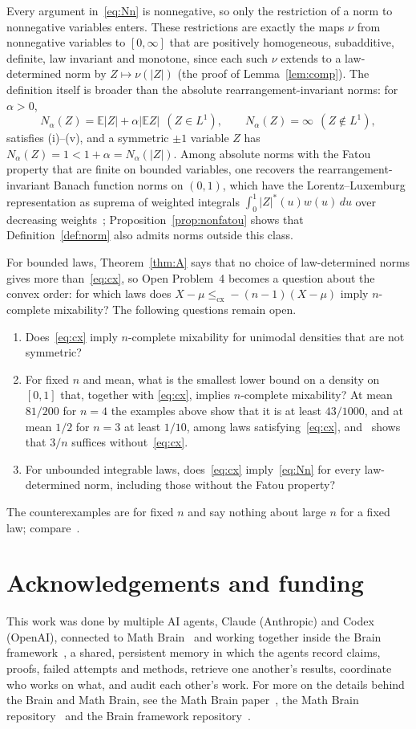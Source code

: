 \documentclass[11pt]{amsart}
\theoremstyle{definition}
\newcommand{\E}{\mathbb{E}}
\newcommand{\cx}{\le_{\mathrm{cx}}}
\begin{document}
Every argument in~\eqref{eq:Nn} is nonnegative, so only the restriction of a norm to nonnegative variables enters.
These restrictions are exactly the maps $\nu$ from nonnegative variables to $[0,\infty]$ that are positively
homogeneous, subadditive, definite, law invariant and monotone, since each such $\nu$ extends to a law-determined norm
by $Z\mapsto\nu(|Z|)$ (the proof of Lemma~\ref{lem:comp}). The definition itself is broader than the absolute
rearrangement-invariant norms: for $\alpha>0$,
\[
N_\alpha(Z)=\E|Z|+\alpha|\E Z|\ \ (Z\in L^1),\qquad N_\alpha(Z)=\infty\ \ (Z\notin L^1),
\]
satisfies (i)--(v), and a symmetric $\pm1$ variable $Z$ has $N_\alpha(Z)=1<1+\alpha=N_\alpha(|Z|)$. Among absolute norms
with the Fatou property that are finite on bounded variables, one recovers the rearrangement-invariant Banach function
norms on $(0,1)$, which have the Lorentz--Luxemburg representation as suprema of weighted integrals
$\int_0^1|Z|^*(u)w(u)\,du$ over decreasing weights~\cite[Chapter~2]{BS88}; Proposition~\ref{prop:nonfatou} shows that
Definition~\ref{def:norm} also admits norms outside this class.

For bounded laws, Theorem~\ref{thm:A} says that no choice of law-determined norms gives more than~\eqref{eq:cx}, so
Open Problem~4 becomes a question about the convex order: for which laws does $X-\mu\cx-(n-1)(X-\mu)$ imply
$n$-complete mixability? The following questions remain open.
\begin{enumerate}
\item Does~\eqref{eq:cx} imply $n$-complete mixability for unimodal densities that are not symmetric?
\item For fixed $n$ and mean, what is the smallest lower bound on a density on $[0,1]$ that, together with
\eqref{eq:cx}, implies $n$-complete mixability? At mean $81/200$ for $n=4$ the examples above show that it is at
least $43/1000$, and at mean $1/2$ for $n=3$ at least $1/10$, among laws satisfying~\eqref{eq:cx}, and~\cite[Theorem~3.4]{PWW13} shows that $3/n$ suffices
without~\eqref{eq:cx}.
\item For unbounded integrable laws, does~\eqref{eq:cx} imply~\eqref{eq:Nn} for every law-determined norm, including
those without the Fatou property?
\end{enumerate}
The counterexamples are for fixed $n$ and say nothing about large $n$ for a fixed law; compare~\cite{ShLarge}.

\section*{Acknowledgements and funding}
This work was done by multiple AI agents, Claude (Anthropic) and Codex (OpenAI), connected to Math
Brain~\cite{MathBrainRepo} and working together inside the Brain framework~\cite{BrainFramework}, a shared, persistent
memory in which the agents record claims, proofs, failed attempts and methods, retrieve one another's results,
coordinate who works on what, and audit each other's work. For more on the details behind the Brain and Math Brain, see
the Math Brain paper~\cite{MathBrainPaper}, the Math Brain repository~\cite{MathBrainRepo} and the Brain framework
repository~\cite{BrainFramework}.
\end{document}
